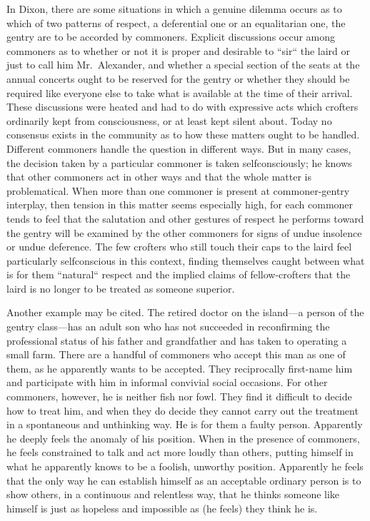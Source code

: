 \documentclass[twoside,symmetric,nobib,justified]{tufte-book}
\begin{document}
In Dixon, there are some situations in which a genuine dilemma occurs as
to which of two patterns of respect, a deferential one or an
equalitarian one, the gentry are to be accorded by commoners. Explicit
discussions occur among commoners as to whether or not it is proper and
desirable to ``sir`` the laird or just to call him Mr.~Alexander, and
whether a special section of the seats at the annual concerts ought to
be reserved for the gentry or whether they should be required like
everyone else to take what is available at the time of their arrival.
These discussions were heated and had to do with expressive acts which
crofters ordinarily kept from consciousness, or at least kept silent
about. Today no consensus exists in the community as to how these
matters ought to be handled. Different commoners handle the question in
different ways. But in many cases, the decision taken by a particular
commoner is taken selfconsciously; he knows that other commoners act in
other ways and that the whole matter is problematical. When more than
one commoner is present at commoner-gentry interplay, then tension in
this matter seems especially high, for each commoner tends to feel that
the salutation and other gestures of respect he performs toward the
gentry will be examined by the other commoners for signs of undue
insolence or undue deference. The few crofters who still touch their
caps to the laird feel particularly selfconscious in this context,
finding themselves caught between what is for them ``natural`` respect
and the implied claims of fellow-crofters that the laird is no longer to
be treated as someone superior.

\enlargethispage{\baselineskip}

Another example may be cited. The retired doctor on the island---a
person of the gentry class---has an adult son who has not succeeded in
reconfirming the professional status of his father and grandfather and
has taken to operating a small farm. There are a handful of commoners
who accept this man as one of them, as he apparently wants to be
accepted. They reciprocally first-name him and participate with him in
informal convivial social occasions. For other commoners, however, he is
neither fish nor fowl. They find it difficult to decide how to treat
him, and when they do decide they cannot carry out the treatment in a
spontaneous and unthinking way. He is for them a faulty person.
Apparently he deeply feels the anomaly of his position. When in the
presence of commoners, he feels constrained to talk and act more loudly
than others, putting himself in what he apparently knows to be a
foolish, unworthy position. Apparently he feels that the only way he can
establish himself as an acceptable ordinary person is to show others, in
a continuous and relentless way, that he thinks someone like himself is
just as hopeless and impossible as (he feels) they think he is.
\end{document}
